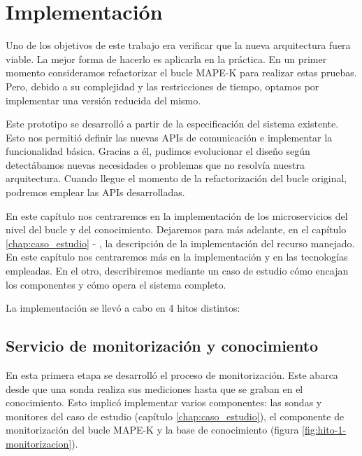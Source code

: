 
\chapter{Implementación}
\label{chap:implementación}

Uno de los objetivos de este trabajo era verificar que la nueva arquitectura fuera viable. La mejor forma de hacerlo es aplicarla en la práctica. En un primer momento consideramos refactorizar el bucle MAPE-K  para realizar estas pruebas. Pero, debido a su complejidad y las restricciones de tiempo, optamos por implementar una versión reducida del mismo.

Este prototipo se desarrolló a partir de la especificación del sistema existente. Esto nos permitió definir las nuevas APIs de comunicación e implementar la funcionalidad básica. Gracias a él, pudimos evolucionar el diseño según detectábamos nuevas necesidades o problemas que no resolvía nuestra arquitectura. Cuando llegue el momento de la refactorización del bucle original, podremos emplear las APIs desarrolladas.

En este capítulo nos centraremos en la implementación de los microservicios del nivel del bucle y del conocimiento. Dejaremos para más adelante, en el capítulo \ref{chap:caso_estudio} - , la descripción de la implementación del recurso manejado. En este capítulo nos centraremos más en la implementación y en las tecnologías empleadas. En el otro, describiremos mediante un caso de estudio cómo encajan los componentes y cómo opera el sistema completo.

La implementación se llevó a cabo en 4 hitos distintos:

\section{Servicio de monitorización y conocimiento}

En esta primera etapa se desarrolló el proceso de monitorización. Este abarca desde que una sonda realiza sus mediciones hasta que se graban en el conocimiento. Esto implicó implementar varios componentes: las sondas y monitores del caso de estudio (capítulo \ref{chap:caso_estudio}), el componente de monitorización del bucle MAPE-K y la base de conocimiento (figura \ref{fig:hito-1-monitorizacion}).

